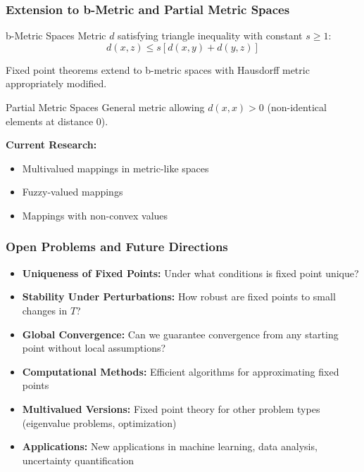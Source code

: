 \documentclass[aspectratio=169,10pt]{beamer}
\begin{document}
\begin{frame}
\frametitle{Extension to b-Metric and Partial Metric Spaces}

\begin{block}{b-Metric Spaces}
Metric $d$ satisfying triangle inequality with constant $s \geq 1$:
\[
d(x,z) \leq s[d(x,y) + d(y,z)]
\]
\end{block}

\begin{theorem}
Fixed point theorems extend to b-metric spaces with Hausdorff metric appropriately modified.
\end{theorem}

\vspace{0.3cm}

\begin{block}{Partial Metric Spaces}
General metric allowing $d(x,x) > 0$ (non-identical elements at distance 0).
\end{block}

\vspace{0.3cm}

\textbf{Current Research:}
\begin{itemize}
    \item Multivalued mappings in metric-like spaces
    \item Fuzzy-valued mappings
    \item Mappings with non-convex values
\end{itemize}

\end{frame}

\begin{frame}
\frametitle{Open Problems and Future Directions}

\begin{itemize}
    \item \textbf{Uniqueness of Fixed Points:} Under what conditions is fixed point unique?

    \item \textbf{Stability Under Perturbations:} How robust are fixed points to small changes in $T$?

    \item \textbf{Global Convergence:} Can we guarantee convergence from any starting point without local assumptions?

    \item \textbf{Computational Methods:} Efficient algorithms for approximating fixed points

    \item \textbf{Multivalued Versions:} Fixed point theory for other problem types (eigenvalue problems, optimization)

    \item \textbf{Applications:} New applications in machine learning, data analysis, uncertainty quantification
\end{itemize}

\end{frame}
\end{document}
